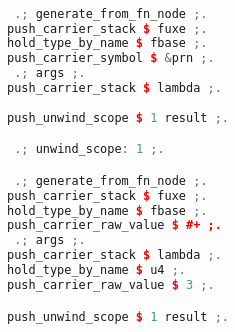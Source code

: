 \begin{lstlisting}[caption={Contextual Parsing for String Literals},
language = C++, numbers = none, label={lst:figPVM},
    basicstyle = \ttfamily\bfseries\tiny, linewidth = .95\linewidth] 

 .; generate_from_fn_node ;.
push_carrier_stack $ fuxe ;.
hold_type_by_name $ fbase ;.
push_carrier_symbol $ &prn ;.
 .; args ;.
push_carrier_stack $ lambda ;.
 
push_unwind_scope $ 1 result ;.

 .; unwind_scope: 1 ;.

 .; generate_from_fn_node ;.
push_carrier_stack $ fuxe ;.
hold_type_by_name $ fbase ;.
push_carrier_raw_value $ #+ ;.
 .; args ;.
push_carrier_stack $ lambda ;.
hold_type_by_name $ u4 ;.
push_carrier_raw_value $ 3 ;.

push_unwind_scope $ 1 result ;.

\end{lstlisting}
\begin{tikzpicture}[remember picture, overlay, text width=.95\linewidth]


\end{tikzpicture} 
